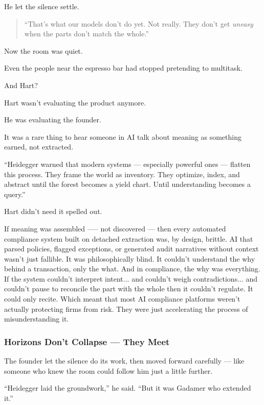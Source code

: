 He let the silence settle.

\begin{quote}
``That’s what our models don’t do yet.  
Not really.  
They don’t get \textit{uneasy} when the parts don’t match the whole.''
\end{quote}

Now the room was quiet.

Even the people near the espresso bar had stopped pretending to multitask.

And Hart?

Hart wasn’t evaluating the product anymore.

He was evaluating the founder.






It was a rare thing to hear someone in AI talk about meaning as something earned, not extracted.

``Heidegger warned that modern systems 
--- especially powerful ones --- 
flatten this process.
They frame the world as inventory.
They optimize, index, and abstract until the forest becomes a yield chart.
Until understanding becomes a query.''

Hart didn’t need it spelled out.

If meaning was assembled —-- not discovered --- then every automated compliance system built on 
detached extraction was, by design, brittle. AI that parsed policies, flagged exceptions, or 
generated audit narratives without context wasn’t just fallible. It was philosophically blind. 
It couldn’t understand the why behind a transaction, only the what. 
And in compliance, the why was everything. 
If the system couldn’t interpret intent... 
and couldn’t weigh contradictions... 
and couldn’t pause to reconcile the part with the whole then it couldn’t regulate. 
It could only recite. 
Which meant that most AI compliance platforms weren’t actually protecting firms from risk. 
They were just accelerating the process of misunderstanding it.

\subsubsection{Horizons Don’t Collapse — They Meet}

The founder let the silence do its work, then moved forward carefully — like someone who knew the room could follow him just a little further.

``Heidegger laid the groundwork,'' he said.  
``But it was Gadamer who extended it.''

